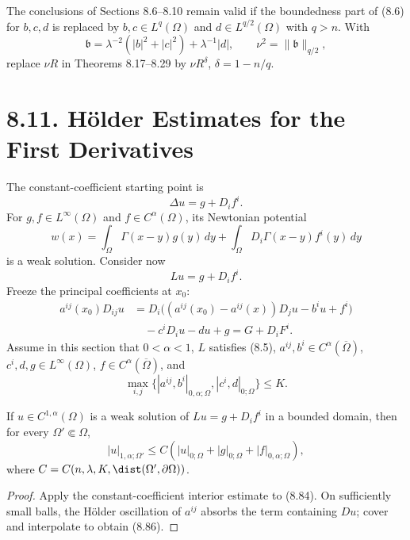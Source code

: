 \begin{remark}
\label{gt-rem-8-integrable-lower-order-coefficients}
The conclusions of Sections 8.6--8.10 remain valid if the boundedness part of
(8.6) for $b,c,d$ is replaced by
$b,c\in L^q(\Omega)$ and $d\in L^{q/2}(\Omega)$ with $q>n$. With
\[
\mathfrak b=\lambda^{-2}(|b|^2+|c|^2)+\lambda^{-1}|d|,
\qquad \nu^2=\|\mathfrak b\|_{q/2},
\]
replace $\nu R$ in Theorems 8.17--8.29 by $\nu R^\delta$,
$\delta=1-n/q$.
\end{remark}

\section*{8.11. H\"older Estimates for the First Derivatives}

The constant-coefficient starting point is
\begin{equation}
\Delta u=g+D_if^i.
\tag{8.82}
\end{equation}
For $g,f\in L^\infty(\Omega)$ and $f\in C^\alpha(\Omega)$, its Newtonian
potential
\[
w(x)=\int_\Omega\Gamma(x-y)g(y)\,dy
+\int_\Omega D_i\Gamma(x-y)f^i(y)\,dy
\]
is a weak solution. Consider now
\begin{equation}
Lu=g+D_if^i.
\tag{8.83}
\end{equation}
Freeze the principal coefficients at $x_0$:
\begin{equation}
\begin{split}
a^{ij}(x_0)D_{ij}u
&=D_i\bigl((a^{ij}(x_0)-a^{ij}(x))D_ju-b^iu+f^i\bigr)\\
&\quad-c^iD_iu-du+g=G+D_iF^i.
\end{split}
\tag{8.84}
\end{equation}
Assume in this section that $0<\alpha<1$, $L$ satisfies (8.5),
$a^{ij},b^i\in C^\alpha(\overline\Omega)$,
$c^i,d,g\in L^\infty(\Omega)$, $f\in C^\alpha(\overline\Omega)$, and
\begin{equation}
\max_{i,j}\{|a^{ij},b^i|_{0,\alpha;\Omega},|c^i,d|_{0;\Omega}\}\leq K.
\tag{8.85}
\end{equation}

\begin{theorem}
\label{gt-thm-8-32-interior-gradient-holder}
If $u\in C^{1,\alpha}(\Omega)$ is a weak solution of
$Lu=g+D_if^i$ in a bounded domain, then for every $\Omega'\Subset\Omega$,
\begin{equation}
|u|_{1,\alpha;\Omega'}
\leq C(|u|_{0;\Omega}+|g|_{0;\Omega}+|f|_{0,\alpha;\Omega}),
\tag{8.86}
\end{equation}
where $C=C(n,\lambda,K,\dist(\Omega',\partial\Omega))$.
\end{theorem}
\begin{proof}
\sketch Apply the constant-coefficient interior estimate to (8.84). On sufficiently
small balls, the H\"older oscillation of $a^{ij}$ absorbs the term containing $Du$;
cover and interpolate to obtain (8.86).
\end{proof}


